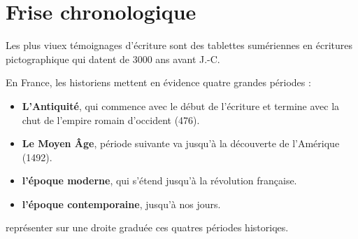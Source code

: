 \section{Frise chronologique}

Les plus viuex témoignages d'écriture sont des tablettes sumériennes en écritures pictographique qui datent de 3000 ans avant J.-C.

En France, les historiens mettent en évidence quatre grandes périodes :
\begin{itemize}
	\item \textbf{L'Antiquité}, qui commence avec le début de l'écriture et termine avec la chut de l'empire romain d'occident (476).
	
	\item \textbf{Le Moyen \^Age}, période suivante va jusqu'à la découverte de l'Amérique (1492).
	
	\item \textbf{l'époque moderne}, qui s'étend jusqu'à la révolution française.
	
	\item \textbf{l'époque contemporaine}, jusqu'à nos jours.
\end{itemize}

\begin{questions}
	\question représenter sur une droite graduée ces quatres périodes historiqes. 
\end{questions}